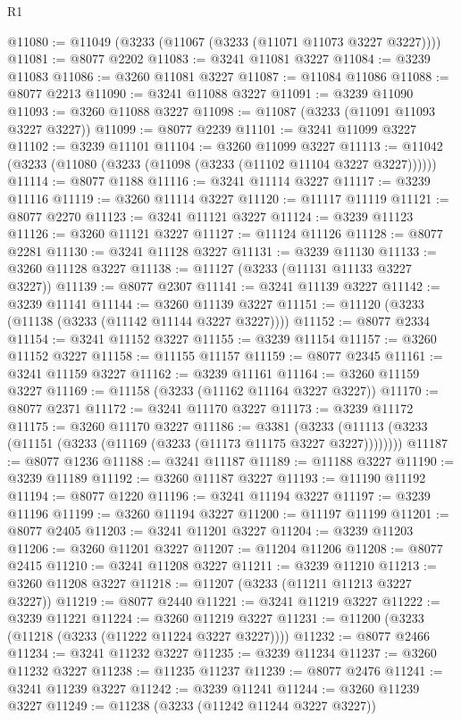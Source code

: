 \begin{lexlean}{R1}
\begin{coremodule}
@11080 := @11049 (@3233 (@11067 (@3233 (@11071 @11073 @3227 @3227))))
@11081 := @8077 @2202
@11083 := @3241 @11081 @3227
@11084 := @3239 @11083
@11086 := @3260 @11081 @3227
@11087 := @11084 @11086
@11088 := @8077 @2213
@11090 := @3241 @11088 @3227
@11091 := @3239 @11090
@11093 := @3260 @11088 @3227
@11098 := @11087 (@3233 (@11091 @11093 @3227 @3227))
@11099 := @8077 @2239
@11101 := @3241 @11099 @3227
@11102 := @3239 @11101
@11104 := @3260 @11099 @3227
@11113 := @11042 (@3233 (@11080 (@3233 (@11098 (@3233 (@11102 @11104 @3227 @3227))))))
@11114 := @8077 @1188
@11116 := @3241 @11114 @3227
@11117 := @3239 @11116
@11119 := @3260 @11114 @3227
@11120 := @11117 @11119
@11121 := @8077 @2270
@11123 := @3241 @11121 @3227
@11124 := @3239 @11123
@11126 := @3260 @11121 @3227
@11127 := @11124 @11126
@11128 := @8077 @2281
@11130 := @3241 @11128 @3227
@11131 := @3239 @11130
@11133 := @3260 @11128 @3227
@11138 := @11127 (@3233 (@11131 @11133 @3227 @3227))
@11139 := @8077 @2307
@11141 := @3241 @11139 @3227
@11142 := @3239 @11141
@11144 := @3260 @11139 @3227
@11151 := @11120 (@3233 (@11138 (@3233 (@11142 @11144 @3227 @3227))))
@11152 := @8077 @2334
@11154 := @3241 @11152 @3227
@11155 := @3239 @11154
@11157 := @3260 @11152 @3227
@11158 := @11155 @11157
@11159 := @8077 @2345
@11161 := @3241 @11159 @3227
@11162 := @3239 @11161
@11164 := @3260 @11159 @3227
@11169 := @11158 (@3233 (@11162 @11164 @3227 @3227))
@11170 := @8077 @2371
@11172 := @3241 @11170 @3227
@11173 := @3239 @11172
@11175 := @3260 @11170 @3227
@11186 := @3381
    (@3233 (@11113 (@3233 (@11151 (@3233 (@11169 (@3233 (@11173 @11175 @3227 @3227))))))))
@11187 := @8077 @1236
@11188 := @3241 @11187
@11189 := @11188 @3227
@11190 := @3239 @11189
@11192 := @3260 @11187 @3227
@11193 := @11190 @11192
@11194 := @8077 @1220
@11196 := @3241 @11194 @3227
@11197 := @3239 @11196
@11199 := @3260 @11194 @3227
@11200 := @11197 @11199
@11201 := @8077 @2405
@11203 := @3241 @11201 @3227
@11204 := @3239 @11203
@11206 := @3260 @11201 @3227
@11207 := @11204 @11206
@11208 := @8077 @2415
@11210 := @3241 @11208 @3227
@11211 := @3239 @11210
@11213 := @3260 @11208 @3227
@11218 := @11207 (@3233 (@11211 @11213 @3227 @3227))
@11219 := @8077 @2440
@11221 := @3241 @11219 @3227
@11222 := @3239 @11221
@11224 := @3260 @11219 @3227
@11231 := @11200 (@3233 (@11218 (@3233 (@11222 @11224 @3227 @3227))))
@11232 := @8077 @2466
@11234 := @3241 @11232 @3227
@11235 := @3239 @11234
@11237 := @3260 @11232 @3227
@11238 := @11235 @11237
@11239 := @8077 @2476
@11241 := @3241 @11239 @3227
@11242 := @3239 @11241
@11244 := @3260 @11239 @3227
@11249 := @11238 (@3233 (@11242 @11244 @3227 @3227))

\end{coremodule}
\end{lexlean}
